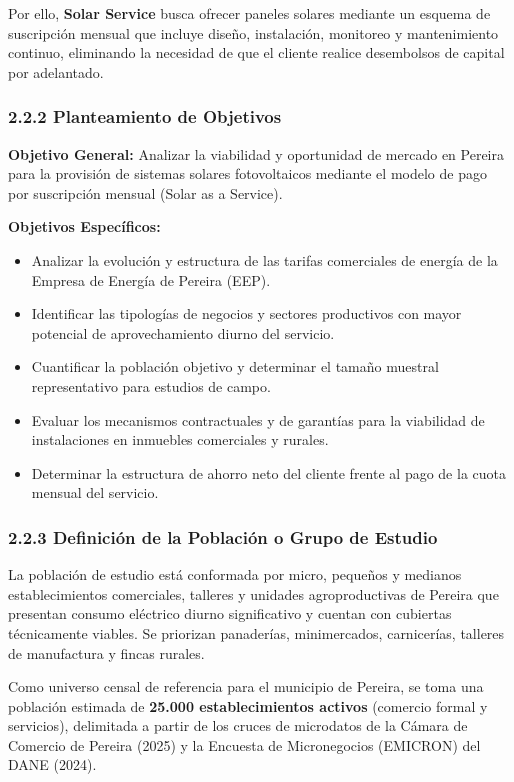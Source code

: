 \documentclass[12pt,letterpaper]{article}
\begin{document}
Por ello, \textbf{Solar Service} busca ofrecer paneles solares mediante un esquema de suscripción mensual que incluye diseño, instalación, monitoreo y mantenimiento continuo, eliminando la necesidad de que el cliente realice desembolsos de capital por adelantado.

\subsubsection{2.2.2 Planteamiento de Objetivos}

\textbf{Objetivo General:}
Analizar la viabilidad y oportunidad de mercado en Pereira para la provisión de sistemas solares fotovoltaicos mediante el modelo de pago por suscripción mensual (Solar as a Service).

\textbf{Objetivos Específicos:}
\begin{itemize}[leftmargin=1.5em, itemsep=2pt]
    \item Analizar la evolución y estructura de las tarifas comerciales de energía de la Empresa de Energía de Pereira (EEP).
    \item Identificar las tipologías de negocios y sectores productivos con mayor potencial de aprovechamiento diurno del servicio.
    \item Cuantificar la población objetivo y determinar el tamaño muestral representativo para estudios de campo.
    \item Evaluar los mecanismos contractuales y de garantías para la viabilidad de instalaciones en inmuebles comerciales y rurales.
    \item Determinar la estructura de ahorro neto del cliente frente al pago de la cuota mensual del servicio.
\end{itemize}

\subsubsection{2.2.3 Definición de la Población o Grupo de Estudio}

La población de estudio está conformada por micro, pequeños y medianos establecimientos comerciales, talleres y unidades agroproductivas de Pereira que presentan consumo eléctrico diurno significativo y cuentan con cubiertas técnicamente viables. Se priorizan panaderías, minimercados, carnicerías, talleres de manufactura y fincas rurales.

Como universo censal de referencia para el municipio de Pereira, se toma una población estimada de \textbf{25.000 establecimientos activos} (comercio formal y servicios), delimitada a partir de los cruces de microdatos de la Cámara de Comercio de Pereira (2025) y la Encuesta de Micronegocios (EMICRON) del DANE (2024).
\end{document}
